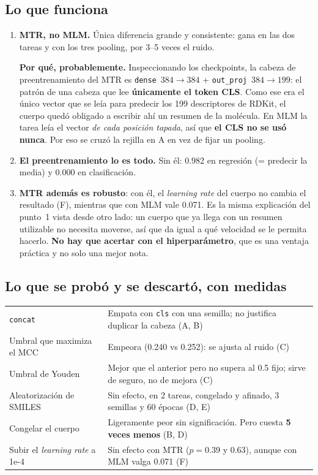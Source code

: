 \documentclass[11pt,a4paper]{article}
\newcommand{\var}[1]{\texttt{#1}}
\begin{document}
\subsection*{Lo que funciona}
\begin{enumerate}
  \item \textbf{MTR, no MLM.} Única diferencia grande y consistente: gana en las dos tareas y con los
        tres pooling, por 3--5 veces el ruido.

        \smallskip
        \textbf{Por qué, probablemente.} Inspeccionando los checkpoints, la cabeza de preentrenamiento
        del MTR es \var{dense}~$384{\to}384$ + \var{out\_proj}~$384{\to}199$: el patrón de una cabeza
        que lee \textbf{únicamente el token CLS}. Como ese era el único vector que se leía para
        predecir los 199 descriptores de RDKit, el cuerpo quedó obligado a escribir ahí un resumen de
        la molécula. En MLM la tarea leía el vector \emph{de cada posición tapada}, así que
        \textbf{el CLS no se usó nunca}. Por eso se cruzó la rejilla en A en vez de fijar un pooling.
  \item \textbf{El preentrenamiento lo es todo.} Sin él: 0.982 en regresión (= predecir la media) y
        0.000 en clasificación.
  \item \textbf{MTR además es robusto}: con él, el \emph{learning rate} del cuerpo no cambia el
        resultado (F), mientras que con MLM vale 0.071. Es la misma explicación del punto~1 vista desde
        otro lado: un cuerpo que ya llega con un resumen utilizable no necesita moverse, así que da
        igual a qué velocidad se le permita hacerlo. \textbf{No hay que acertar con el hiperparámetro},
        que es una ventaja práctica y no solo una mejor nota.
\end{enumerate}

\subsection*{Lo que se probó y se descartó, con medidas}
\begin{tabularx}{\linewidth}{@{}lX@{}}
\toprule
\var{concat} & Empata con \var{cls} con una semilla; no justifica duplicar la cabeza (A, B) \\
Umbral que maximiza el MCC & Empeora (0.240 vs 0.252): se ajusta al ruido (C) \\
Umbral de Youden & Mejor que el anterior pero no supera al 0.5 fijo; sirve de seguro, no de mejora (C) \\
Aleatorización de SMILES & Sin efecto, en 2 tareas, congelado y afinado, 3 semillas y 60 épocas (D, E) \\
Congelar el cuerpo & Ligeramente peor sin significación. Pero cuesta \textbf{5 veces menos} (B, D) \\
Subir el \emph{learning rate} a 1e-4 & Sin efecto con MTR ($p=0.39$ y $0.63$), aunque con MLM valga 0.071 (F) \\
\bottomrule
\end{tabularx}
\end{document}
